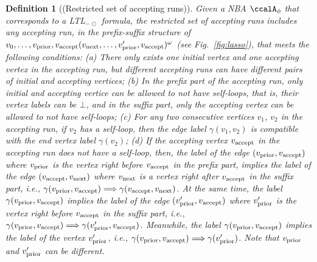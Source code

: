 \documentclass[Afour,sageh,times]{sagej}
\newtheorem{defn}[thm]{Definition}
\newcommand{\ltl}{ {\it LTL}$_{-\bigcirc}$ }
\newcommand{\autop}{\ccalA_{\phi}}
\newcommand{\vertex}[1]{v_{\textup{#1}}}
\newcommand{\simplies}{\DOTSB\Longrightarrow}
\begin{document}
\begin{defn}[(Restricted set of accepting runs)]\label{defn:run}
  Given a NBA $\autop$ that corresponds to a \ltl formula, the  restricted set of accepting runs includes any accepting run, in the prefix-suffix structure of $v_0, \ldots, \vertex{prior}, \vertex{accept} (\vertex{next}, \ldots, \vertex{prior}', \vertex{accept})^\omega$ (see Fig.~\ref{fig:lasso}), that meets the following conditions: (a)\label{cond:a} There only exists one initial vertex and one  accepting vertex in the accepting run, but different accepting runs can have different pairs of initial and accepting vertices; (b)\label{cond:b} In the prefix part of the accepting run, only initial and accepting vertice can be allowed to not have self-loops, that is, their vertex labels  can be $\bot$, and in the suffix part,  only the accepting vertex can be allowed to not have self-loops; %
  (c)\label{cond:c} For any two consecutive vertices $v_1$, $v_2$ in the accepting run, if $v_2$ has a self-loop, then the edge label $\gamma(v_1, v_2)$ is compatible with   the end vertex label $\gamma(v_2)$;
  (d)\label{cond:d}  If the accepting vertex $\vertex{accept}$ in the accepting run does not have a self-loop, then, the label of the edge $(\vertex{prior}, \vertex{accept})$ where $\vertex{prior}$ is the vertex right before $\vertex{accept}$ in the prefix part, implies the label of the edge $(\vertex{accept}, \vertex{next})$ where $\vertex{next}$ is a vertex right after $\vertex{accept}$ in the suffix part, i.e., $\gamma(\vertex{prior}, \vertex{accept}) \simplies  \gamma(\vertex{accept}, \vertex{next})$. At the same time, the label $\gamma(\vertex{prior}, \vertex{accept})$ implies the label of the edge $(\vertex{prior}', \vertex{accept})$ where $\vertex{prior}'$ is the vertex right before $\vertex{accept}$ in the suffix part, i.e., $\gamma(\vertex{prior}, \vertex{accept}) \simplies  \gamma(\vertex{prior}', \vertex{accept})$.
  Meanwhile, the label $\gamma(\vertex{prior}, \vertex{accept})$ implies the label of the vertex $\vertex{prior}'$, i.e., $\gamma(\vertex{prior}, \vertex{accept}) \simplies \gamma(\vertex{prior}')$. Note that $\vertex{prior}$ and $\vertex{prior}'$ can be different.

\end{defn}
\end{document}

